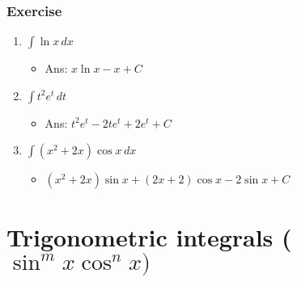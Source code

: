 \documentclass[t]{beamer}
\theoremstyle{plain}
\theoremstyle{definition}
\newcommand{\ds}{\displaystyle}
\newcommand{\dx}{\,dx}
\begin{document}
\begin{frame}
\frametitle{Exercise} 

\begin{enumerate}
	\item $\int \ln{x} \,dx$
	\begin{itemize}
		\item Ans: $x\ln{x} -x + C$ %
	\end{itemize}
	\item $\int t^2e^t \,dt$
	\begin{itemize}
		\item Ans: $t^2e^t - 2te^t + 2e^t + C$ %
	\end{itemize}
	\item $\int (x^2 + 2x)\cos x \dx$ %
	\begin{itemize}
		\item $(x^2 + 2x)\sin{x} + (2x + 2)\cos{x} - 2\sin{x} + C$
	\end{itemize}
\end{enumerate}

\end{frame}


\section{Trigonometric integrals ($\sin^m{x}\cos^n{x})$}

%
%
%
%
\end{document}
